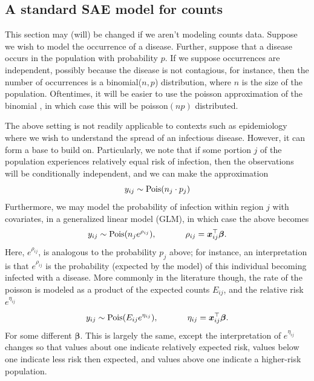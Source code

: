 \documentclass[twoside,12pt,bibstyle=chem-acs]{reedthesis}
\begin{document}
\subsection{A standard SAE model for counts}
\label{sbsc: standard SAE}
This section may (will) be changed if we aren't modeling counts data.
Suppose we wish to model the occurrence of a disease. Further, suppose that a disease occurs in the population with probability $p$. If we suppose occurrences are independent, possibly because the disease is not contagious, for instance, then the number of occurrences is a binomial($n,p$) distribution, where $n$ is the size of the population. Oftentimes, it will be easier to use the poisson approximation of the binomial \cite{elliott_spatial_2000}, in which case this will be poisson$(np)$ distributed.

The above setting is not readily applicable to contexts such as epidemiology where we wish to understand the spread of an infectious disease. However, it can form a base to build on. Particularly, we note that if some portion $j$ of the population experiences relatively equal risk of infection, then the observations will be conditionally independent, and we can make the approximation
\begin{equation*}
y_{ij} \sim \mathrm{Pois}(n_j \cdot p_j)
\end{equation*}
Furthermore, we may model the probability of infection within region $j$ with covariates, in a generalized linear model (GLM), in which case the above becomes
\begin{equation}
y_{ij} \sim \pois(n_j e^{\rho_{ij}}), \hspace{0.1\linewidth} \rho_{ij} = \bm{x}_{ij}^\top \bm\beta.
\label{eq: counts}
\end{equation}
Here, $e^{\rho_{ij}}$, is analogous to the probability $p_j$ above; for instance, an interpretation is that $e^{\rho_{ij}}$ is the probability (expected by the model) of this individual becoming infected with a disease. More commonly in the literature though, the rate of the poisson is modeled as a product of the expected counts $E_{ij}$, and the relative risk $e^{\eta_{ij}}$ \cite{wehrhahn_bayesian_2020}
\begin{equation*}
y_{ij} \sim \pois(E_{ij} e^{\eta_{ij}}), \hspace{0.1\linewidth} \eta_{ij} = \bm{x}_{ij}^\top \bm\beta.
\end{equation*}
For some different $\bm\beta$. This is largely the same, except the interpretation of $e^{\eta_{ij}}$ changes so that values about one indicate relatively expected risk, values below one indicate less risk then expected, and values above one indicate a higher-risk population.
\end{document}
